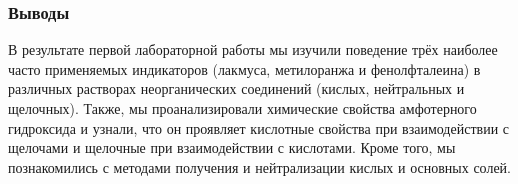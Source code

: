 \documentclass[12pt, a4paper]{article}
\begin{document}
	\subsubsection*{Выводы}
	В результате первой лабораторной работы мы изучили поведение трёх наиболее часто применяемых индикаторов (лакмуса, метилоранжа и фенолфталеина) в различных растворах неорганических соединений (кислых, нейтральных и щелочных). Также, мы проанализировали химические свойства амфотерного гидроксида и узнали, что он проявляет кислотные свойства при взаимодействии с щелочами и щелочные при взаимодействии с кислотами. Кроме того, мы познакомились с методами получения и нейтрализации кислых и основных солей.
	
\end{document}
